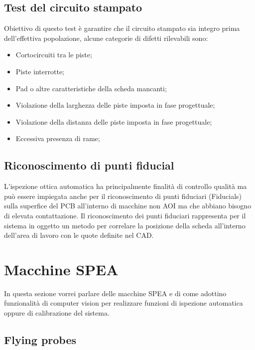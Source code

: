 \subsection{Test del circuito stampato}
Obiettivo di questo test è garantire che il circuito stampato sia integro prima dell’effettiva popolazione,
alcune categorie di difetti rilevabili sono:
\begin{itemize}
\item Cortocircuiti tra le piste;
\item Piste interrotte;
\item Pad o altre caratteristiche della scheda mancanti;
\item Violazione della larghezza delle piste imposta in fase progettuale;
\item Violazione della distanza delle piste imposta in fase progettuale;
\item Eccessiva presenza di rame;
\end{itemize}

\subsection{Riconoscimento di punti fiducial}
L’ispezione ottica automatica ha principalmente finalità di controllo qualità ma può essere impiegata
anche per il riconoscimento di punti fiduciari (Fiducials) sulla superfice del PCB all’interno di macchine non AOI ma che abbiano bisogno di elevata contattazione. Il riconoscimento dei punti fiduciari rappresenta
per il sistema in oggetto un metodo per correlare la posizione della scheda all’interno dell’area di lavoro
con le quote definite nel CAD.

\section{Macchine SPEA}
In questa sezione vorrei parlare delle macchine SPEA e di come adottino
funzionalità di computer vision per realizzare funzioni di ispezione automatica
oppure di calibrazione del sistema.
\subsection{Flying probes}

